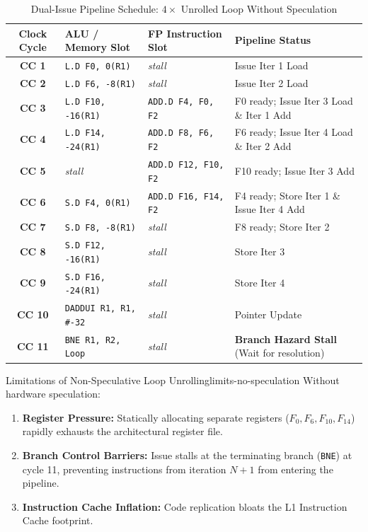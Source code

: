 \begin{table}[htbp]
\centering
\caption{Dual-Issue Pipeline Schedule: $4\times$ Unrolled Loop Without Speculation}
\label{tab:schedule_no_speculation}
\small
\setlength{\tabcolsep}{4pt}
\begin{tabularx}{\textwidth}{|c|>{\hsize=1.1\hsize\raggedright\arraybackslash}X|>{\hsize=1.1\hsize\raggedright\arraybackslash}X|>{\hsize=0.8\hsize\raggedright\arraybackslash}X|}
\hline
\textbf{Clock Cycle} & \textbf{ALU / Memory Slot} & \textbf{FP Instruction Slot} & \textbf{Pipeline Status} \\ \hline
\textbf{CC 1} & \texttt{L.D F0, 0(R1)} & \textit{stall} & Issue Iter 1 Load \\ \hline
\textbf{CC 2} & \texttt{L.D F6, -8(R1)} & \textit{stall} & Issue Iter 2 Load \\ \hline
\textbf{CC 3} & \texttt{L.D F10, -16(R1)} & \texttt{ADD.D F4, F0, F2} & F0 ready; Issue Iter 3 Load \& Iter 1 Add \\ \hline
\textbf{CC 4} & \texttt{L.D F14, -24(R1)} & \texttt{ADD.D F8, F6, F2} & F6 ready; Issue Iter 4 Load \& Iter 2 Add \\ \hline
\textbf{CC 5} & \textit{stall} & \texttt{ADD.D F12, F10, F2} & F10 ready; Issue Iter 3 Add \\ \hline
\textbf{CC 6} & \texttt{S.D F4, 0(R1)} & \texttt{ADD.D F16, F14, F2} & F4 ready; Store Iter 1 \& Issue Iter 4 Add \\ \hline
\textbf{CC 7} & \texttt{S.D F8, -8(R1)} & \textit{stall} & F8 ready; Store Iter 2 \\ \hline
\textbf{CC 8} & \texttt{S.D F12, -16(R1)} & \textit{stall} & Store Iter 3 \\ \hline
\textbf{CC 9} & \texttt{S.D F16, -24(R1)} & \textit{stall} & Store Iter 4 \\ \hline
\textbf{CC 10} & \texttt{DADDUI R1, R1, \#-32} & \textit{stall} & Pointer Update \\ \hline
\textbf{CC 11} & \texttt{BNE R1, R2, Loop} & \textit{stall} & \textbf{Branch Hazard Stall} (Wait for resolution) \\ \hline
\end{tabularx}
\end{table}

\begin{observation}{Limitations of Non-Speculative Loop Unrolling}{limits-no-speculation}
Without hardware speculation:
\begin{enumerate}
    \item \textbf{Register Pressure:} Statically allocating separate registers ($F_0, F_6, F_{10}, F_{14}$) rapidly exhausts the architectural register file.
    \item \textbf{Branch Control Barriers:} Issue stalls at the terminating branch (\texttt{BNE}) at cycle 11, preventing instructions from iteration $N+1$ from entering the pipeline.
    \item \textbf{Instruction Cache Inflation:} Code replication bloats the L1 Instruction Cache footprint.
\end{enumerate}
\end{observation}

